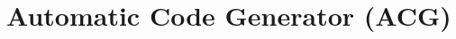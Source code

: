 \chapter{Automatic Code Generator (ACG)}
\label{sec:ACG}
    \lipsum[1]
    
    
    
    
    
    
